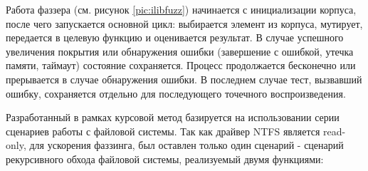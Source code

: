 Работа фаззера (см. рисунок \ref{pic:ilibfuzz}) начинается с инициализации корпуса, после чего запускается основной цикл: выбирается элемент из корпуса, мутирует, передается в целевую функцию и оценивается результат. В случае успешного увеличения покрытия или обнаружения ошибки (завершение с ошибкой, утечка памяти, таймаут) состояние сохраняется. Процесс продолжается бесконечно или прерывается в случае обнаружения ошибки. В последнем случае тест, вызвавший ошибку, сохраняется отдельно для последующего точечного воспроизведения.

Разработанный в рамках курсовой метод базируется на использовании серии сценариев работы с файловой системы. Так как драйвер NTFS является read-only, для ускорения фаззинга, был оставлен только один сценарий - сценарий рекурсивного обхода файловой системы, реализуемый двумя функциями:


